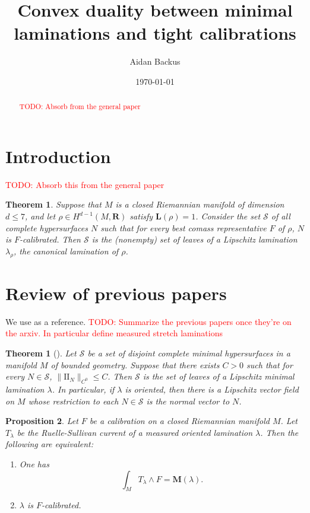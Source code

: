 \documentclass[reqno,11pt]{amsart}
\title{Convex duality between minimal laminations and tight calibrations}
\author{Aidan Backus}
\date{\today}
\newcommand{\RR}{\mathbf{R}}
\newcommand{\Two}{\mathrm{I\!I}}
\newcommand{\Mass}{\mathbf M}
\newcommand{\Comass}{\mathbf L}
\newcommand{\dfn}[1]{\emph{#1}\index{#1}}
\newtheorem{theorem}{Theorem}[section]
\newtheorem{proposition}[theorem]{Proposition}
\newtheorem{mainthm}{Theorem}
\theoremstyle{definition}
\numberwithin{equation}{section}
\newcommand\todo[1]{\textcolor{red}{TODO: #1}}
\begin{document}
\begin{abstract}
\todo{Absorb from the general paper}
\end{abstract}

\maketitle

\section{Introduction}
\todo{Absorb this from the general paper}

\begin{mainthm}\label{existence of calibrated lam}
Suppose that $M$ is a closed Riemannian manifold of dimension $d \leq 7$, and let $\rho \in H^{d - 1}(M, \RR)$ satisfy $\Comass(\rho) = 1$.
Consider the set $\mathscr S$ of all complete hypersurfaces $N$ such that for every best comass representative $F$ of $\rho$, $N$ is $F$-calibrated.
Then $\mathscr S$ is the (nonempty) set of leaves of a Lipschitz lamination $\lambda_\rho$, the \dfn{canonical lamination} of $\rho$.
\end{mainthm}

\section{Review of previous papers}\label{prevResults}
We use \cite{BackusCML, BackusBest1} as a reference.
\todo{Summarize the previous papers once they're on the arxiv. In particular define measured stretch laminations}

\begin{theorem}[{\cite[Theorem A]{BackusCML}}]\label{disjoint surfaces are lamination}
Let $\mathcal S$ be a set of disjoint complete minimal hypersurfaces in a manifold $M$ of bounded geometry.
Suppose that there exists $C > 0$ such that for every $N \in \mathcal S$, $\|\Two_N\|_{C^0} \leq C$.
Then $\mathcal S$ is the set of leaves of a Lipschitz minimal lamination $\lambda$.
In particular, if $\lambda$ is oriented, then there is a Lipschitz vector field on $M$ whose restriction to each $N \in \mathcal S$ is the normal vector to $N$.
\end{theorem}

\begin{proposition}\label{calibration condition}
Let $F$ be a calibration on a closed Riemannian manifold $M$.
Let $T_\lambda$ be the Ruelle-Sullivan current of a measured oriented lamination $\lambda$.
Then the following are equivalent:
\begin{enumerate}
\item One has \begin{equation}\label{calibration by Ruelle Sullivan}
\int_M T_\lambda \wedge F = \Mass(\lambda).
\end{equation}
\item $\lambda$ is $F$-calibrated.
\end{enumerate}
\end{proposition}
\end{document}
